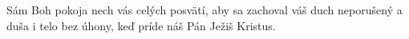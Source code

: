 Sám Boh pokoja nech vás celých posvätí, aby sa zachoval váš duch neporušený a duša i telo bez úhony, keď príde náš Pán Ježiš Kristus.
